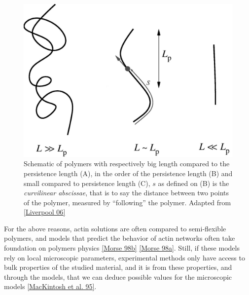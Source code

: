 \documentclass[A4paperpaper,11pt,english]{sphinxmanual}
\begin{document}
\begin{figure}[htbp]
\centering
\capstart

\includegraphics[width=0.600\linewidth]{F2_large.jpg}
\caption{Schematic of polymers with respectively big length compared to the persistence
length (A), in the order of the persistence length (B) and small compared
to persistence length (C), \(s\) as defined on (B) is the \emph{curvilinear
abscissae}, that is to say the distance between two points of the polymer,
measured by ``following'' the polymer. Adapted from {\hyperref[parts/part1:liverpool2006]{{[}Liverpool 06{]}}}}\label{parts/part1:fig-persistence-length}\end{figure}

For the above reasons, actin solutions are often compared to semi-flexible
polymers, and models that predict the behavior of actin networks often take
foundation on polymers physics {\hyperref[parts/part1:morse1998b]{{[}Morse 98b{]}}} {\hyperref[parts/part1:morse1998a]{{[}Morse 98a{]}}}. Still, if
these models rely on local microscopic parameters, experimental methods only
have access to bulk properties of the studied material, and it is from these
properties, and through the models, that we can deduce possible values for the
microscopic models {\hyperref[parts/part1:mackintosh1995]{{[}MacKintosh et al. 95{]}}}.
\end{document}
